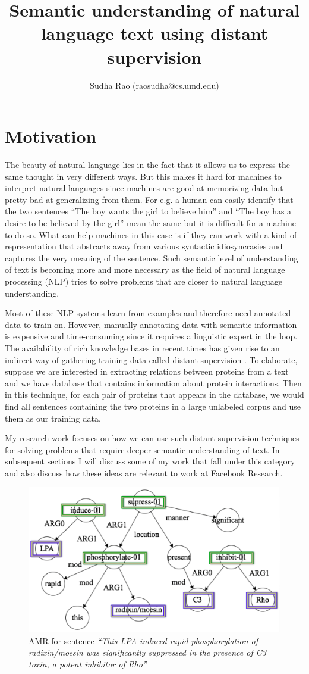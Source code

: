 \documentclass[11pt,a4paper]{article}
\title{Semantic understanding of natural language text using distant supervision}
\author{Sudha Rao (raosudha@cs.umd.edu)}
\begin{document}
\maketitle
\section{Motivation}
The beauty of natural language lies in the fact that it allows us to express the same thought in very different ways. But this makes it hard for machines to interpret natural languages since machines are good at memorizing data but pretty bad at generalizing from them. For e.g. a human can easily identify that the two sentences ``The boy wants the girl to believe him'' and ``The boy has a desire to be believed by the girl'' mean the same but it is difficult for a machine to do so. What can help machines in this case is if they can work with a kind of representation that abstracts away from various syntactic idiosyncrasies and captures the very meaning of the sentence. Such semantic level of understanding of text is becoming more and more necessary as the field of natural language processing (NLP) tries to solve problems that are closer to natural language understanding. 

Most of these NLP systems learn from examples and therefore need annotated data to train on. However, manually annotating data with semantic information is expensive and time-consuming since it requires a linguistic expert in the loop. The availability of rich knowledge bases in recent times has given rise to an indirect way of gathering training data called distant supervision \cite{mintz2009distant}. To elaborate, suppose we are interested in extracting relations between proteins from a text and we have database that contains information about protein interactions. Then in this technique, for each pair of proteins that appears in the database, we would find all sentences containing the two proteins in a large unlabeled corpus and use them as our training data. 
 
My research work focuses on how we can use such distant supervision techniques for solving problems that require deeper semantic understanding of text. In subsequent sections I will discuss some of my work that fall under this category and also discuss how these ideas are relevant to work at Facebook Research.

\begin{figure}
\centering
\includegraphics[width = .5\textwidth]{EgAMR}
\caption{AMR for sentence \textit{``This LPA-induced rapid phosphorylation of radixin/moesin was significantly suppressed in the presence of C3 toxin, a potent inhibitor of Rho''}}
\label{amr_eg}
\end{figure}
\end{document}
